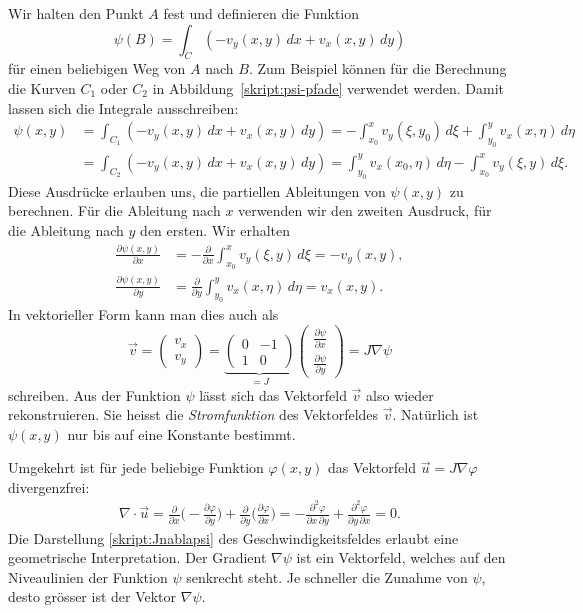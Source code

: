 Wir halten den Punkt $A$ fest und definieren die Funktion
\[
\psi(B)
=
\int_C (-v_y(x,y)\,dx + v_x(x,y)\,dy)
\]
für einen beliebigen Weg von $A$ nach $B$. 
Zum Beispiel können für die Berechnung die Kurven
$C_1$ oder $C_2$ in Abbildung~\ref{skript:psi-pfade}
verwendet werden.
Damit lassen sich die Integrale ausschreiben:
\begin{align*}
\psi(x,y)
&=
\int_{C_1} (-v_y(x,y)\,dx + v_x(x,y)\,dy)
=
-\int_{x_0}^x v_y(\xi, y_0)\,d\xi
+
\int_{y_0}^y v_x(x,\eta)\,d\eta
\\
&=
\int_{C_2} (-v_y(x,y)\,dx + v_x(x,y)\,dy)
=
\int_{y_0}^y v_x(x_0,\eta)\,d\eta
-
\int_{x_0}^x v_y(\xi,y)\,d\xi.
\end{align*}
Diese Ausdrücke erlauben uns, die partiellen Ableitungen von $\psi(x,y)$
zu berechnen.
Für die Ableitung nach $x$ verwenden wir den zweiten Ausdruck, für die
Ableitung nach $y$ den ersten.
Wir erhalten
\begin{align*}
\frac{\partial\psi(x,y)}{\partial x}
&=
-\frac{\partial}{\partial x} \int_{x_0}^x v_y(\xi,y)\,d\xi
=
-v_y(x,y),
\\
\frac{\partial\psi(x,y)}{\partial y}
&=
\frac{\partial}{\partial y} \int_{y_0}^y v_x(x,\eta)\,d\eta
=
v_x(x,y).
\end{align*}
In vektorieller Form kann man dies auch als
\begin{equation}
\vec{v}
=
\begin{pmatrix}v_x\\v_y \end{pmatrix}
=
\underbrace{
\begin{pmatrix}0&-1\\1&0\end{pmatrix}
}_{\displaystyle=J}
\begin{pmatrix}
\frac{\partial\psi}{\partial x}\\
\frac{\partial\psi}{\partial y}
\end{pmatrix}
=
J\nabla\psi
\label{skript:Jnablapsi}
\end{equation}
schreiben.
Aus der Funktion $\psi$ lässt sich das Vektorfeld $\vec{v}$ also wieder
rekonstruieren.
Sie heisst die {\em Stromfunktion} des Vektorfeldes $\vec{v}$.
%
Natürlich ist $\psi(x,y)$ nur bis auf eine Konstante bestimmt.

Umgekehrt ist für jede beliebige Funktion $\varphi(x,y)$ das Vektorfeld
$\vec{u}=J\nabla\varphi$ divergenzfrei:
\begin{align*}
\nabla\cdot\vec{u}
=
\frac{\partial}{\partial x}
\biggl(-\frac{\partial\varphi}{\partial y}\biggr)
+
\frac{\partial}{\partial y}
\biggl(\frac{\partial\varphi}{\partial x}\biggr)
=
-\frac{\partial^2\varphi}{\partial x\,\partial y}
+\frac{\partial^2\varphi}{\partial y\,\partial x}
=
0.
\end{align*}
Die Darstellung \eqref{skript:Jnablapsi} des Geschwindigkeitsfeldes 
erlaubt eine geometrische Interpretation.
Der Gradient $\nabla\psi$ ist ein Vektorfeld, welches auf den
Niveaulinien der Funktion $\psi$ senkrecht steht.
Je schneller die Zunahme von $\psi$, desto grösser ist der
Vektor $\nabla\psi$.

